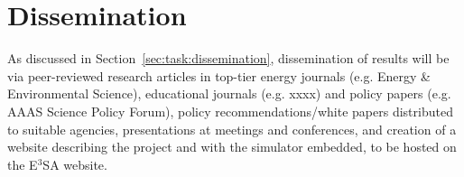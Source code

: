 \documentclass[11pt,a4paper]{article}
\begin{document}
\section{Dissemination}

As discussed in Section~\ref{sec:task:dissemination},
dissemination of results will be via 
peer-reviewed research articles in top-tier energy journals 
(e.g. Energy \& Environmental Science),
educational journals (e.g. xxxx) and 
policy papers (e.g. AAAS Science Policy Forum), 
policy recommendations/white papers distributed to suitable agencies, 
presentations at meetings and conferences, and 
creation of a website describing the project
and with the simulator embedded,
to be hosted on the E$^3$SA website.

\newpage





\end{document}
